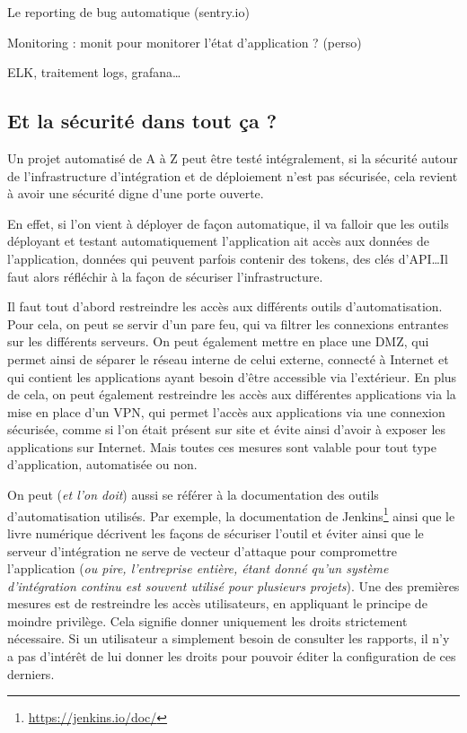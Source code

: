 

Le reporting de bug automatique (sentry.io)

Monitoring : monit pour monitorer l'état d'application ? (perso)

ELK, traitement logs, grafana\ldots

\subsection{Et la sécurité dans tout ça ?}

Un projet automatisé de A à Z peut être testé intégralement, si la sécurité autour de l'infrastructure d'intégration et de déploiement n'est pas sécurisée, cela revient à avoir une sécurité digne d'une porte ouverte.

En effet, si l'on vient à déployer de façon automatique, il va falloir que les outils déployant et testant automatiquement l'application ait accès aux données de l'application, données qui peuvent parfois contenir des tokens, des clés d'\gls{API}\ldots Il faut alors réfléchir à la façon de sécuriser l'infrastructure. 

Il faut tout d'abord restreindre les accès aux différents outils d'automatisation. Pour cela, on peut se servir d'un pare feu, qui va filtrer les connexions entrantes sur les différents serveurs. On peut également mettre en place une \gls{DMZ}, qui permet ainsi de séparer le réseau interne de celui externe, connecté à Internet et qui contient les applications ayant besoin d'être accessible via l'extérieur. En plus de cela, on peut également restreindre les accès aux différentes applications via la mise en place d'un \gls{VPN}, qui permet l'accès aux applications via une connexion sécurisée, comme si l'on était présent sur site et évite ainsi d'avoir à exposer les applications sur Internet. Mais toutes ces mesures sont valable pour tout type d'application, automatisée ou non. 

On peut (\emph{et l'on doit}) aussi se référer à la documentation des outils d'automatisation utilisés. Par exemple, la documentation de Jenkins\footnote{\url{https://jenkins.io/doc/}} ainsi que le livre numérique  \cite[chapitre 7, Sécuriser Jenkins]{jenkins-guide} décrivent les façons de sécuriser l'outil et éviter ainsi que le serveur d'intégration ne serve de vecteur d'attaque pour compromettre l'application (\emph{ou pire, l'entreprise entière, étant donné qu'un système d'intégration continu est souvent utilisé pour plusieurs projets}). Une des premières mesures est de restreindre les accès utilisateurs, en appliquant le principe de moindre privilège. Cela signifie donner uniquement les droits strictement nécessaire. Si un utilisateur a simplement besoin de consulter les rapports, il n'y a pas d'intérêt de lui donner les droits pour pouvoir éditer la configuration de ces derniers.

